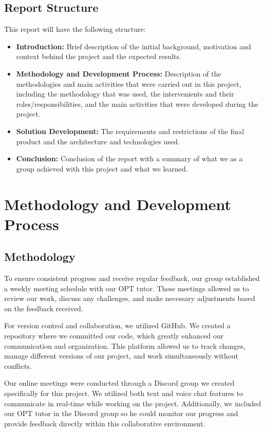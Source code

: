 \documentclass[10pt]{article}
\begin{document}
    \subsection{Report Structure}
        This report will have the following structure:
        \begin{itemize}
            \item     \textbf{Introduction:} Brief description of the initial background, motivation and context behind the project and the expected results.
            \item     \textbf{Methodology and Development Process:} Description of the methodologies and main activities that were carried out in this project, including the methodology that was used, the intervenients and their roles/responsibilities, and the main activities that were developed during the project.
            \item     \textbf{Solution Development:} The requirements and restrictions of the final product and the architecture and technologies used.
            \item     \textbf{Conclusion:} Conclusion of the report with a summary of what we as a group achieved with this project and what we learned.
        \end{itemize}

\section{Methodology and Development Process}

    \subsection{Methodology}

        To ensure consistent progress and receive regular feedback, our group established a weekly meeting schedule with our OPT tutor. These meetings allowed us to review our work, discuss any challenges, and make necessary adjustments based on the feedback received.

        For version control and collaboration, we utilized GitHub. We created a repository where we committed our code, which greatly enhanced our communication and organization. This platform allowed us to track changes, manage different versions of our project, and work simultaneously without conflicts.

        Our online meetings were conducted through a Discord group we created specifically for this project. We utilized both text and voice chat features to communicate in real-time while working on the project. Additionally, we included our OPT tutor in the Discord group so he could monitor our progress and provide feedback directly within this collaborative environment.
\end{document}
